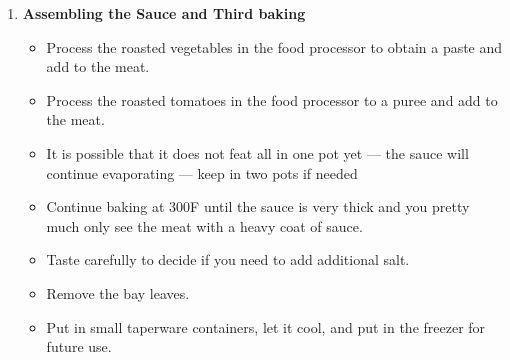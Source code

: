 \documentclass[11pt,letterpaper]{article}
\begin{document}
\begin{description}
\begin{enumerate}
	\item {\bf Assembling the Sauce and Third baking}
		\begin{itemize}
		\item Process the roasted vegetables in the food processor to obtain a paste and add to the meat.
		\item Process the roasted tomatoes in the food processor to a puree and add to the meat.
		\item It is possible that it does not feat all in one pot yet --- the sauce will continue evaporating --- keep in two pots if needed
		\item Continue baking at 300F until the sauce is very thick and you pretty much only see the meat with a heavy coat of sauce.
		\item Taste carefully to decide if you need to add additional salt.
		\item Remove the bay leaves.
		\item Put in small taperware containers, let it cool, and put in the freezer for future use.
		\end{itemize}
     	\end{enumerate}         
\end{description}
\end{document}
